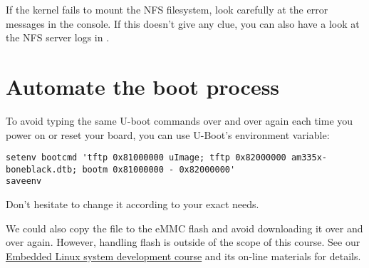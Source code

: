 If the kernel fails to mount the NFS filesystem, look carefully at the
error messages in the console. If this doesn't give any clue, you can
also have a look at the NFS server logs in .

\section{Automate the boot process}

To avoid typing the same U-boot commands over and over again each time
you power on or reset your board, you can use U-Boot's 
environment variable:

{\scriptsize
\begin{verbatim}
setenv bootcmd 'tftp 0x81000000 uImage; tftp 0x82000000 am335x-boneblack.dtb; bootm 0x81000000 - 0x82000000'
saveenv
\end{verbatim}
}

Don't hesitate to change it according to your exact needs.

We could also copy the  file to the eMMC flash and avoid
downloading it over and over again. However, handling flash is outside
of the scope of this course. See our
\href{http://free-electrons.com/training/embedded-linux/}{Embedded
Linux system development course} and its on-line materials for
details.


